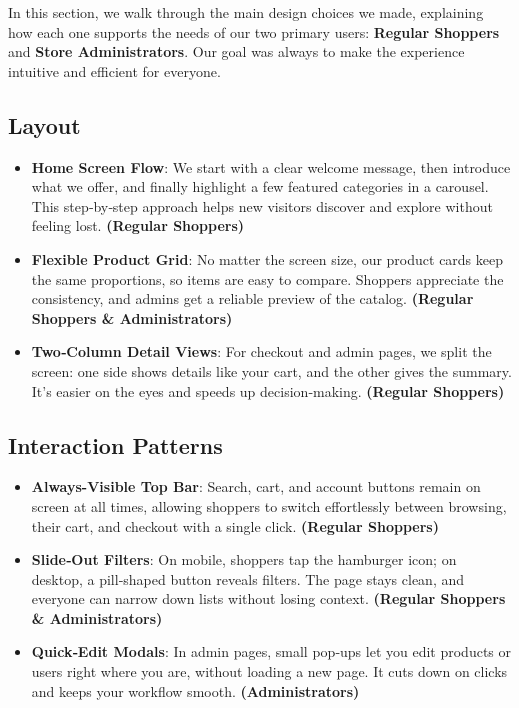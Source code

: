 \documentclass[12pt]{article}
\begin{document}
	In this section, we walk through the main design choices we made, explaining how each one supports the needs of our two primary users: \textbf{Regular Shoppers} and \textbf{Store Administrators}. Our goal was always to make the experience intuitive and efficient for everyone.

	\subsection{Layout}\label{subsec:layout}

	\begin{itemize}
	\item \textbf{Home Screen Flow}: We start with a clear welcome message, then introduce what we offer, and finally highlight a few featured categories in a carousel. This step‑by‑step approach helps new visitors discover and explore without feeling lost. \textbf{(Regular Shoppers)}
	\item \textbf{Flexible Product Grid}: No matter the screen size, our product cards keep the same proportions, so items are easy to compare. Shoppers appreciate the consistency, and admins get a reliable preview of the catalog. \textbf{(Regular Shoppers \& Administrators)}
	\item \textbf{Two‑Column Detail Views}: For checkout and admin pages, we split the screen: one side shows details like your cart, and the other gives the summary. It’s easier on the eyes and speeds up decision‑making. \textbf{(Regular Shoppers)}
	\end{itemize}

	\subsection{Interaction Patterns}\label{subsec:interaction-patterns}

	\begin{itemize}
	\item \textbf{Always-Visible Top Bar}: Search, cart, and account buttons remain on screen at all times, allowing shoppers to switch effortlessly between browsing, their cart, and checkout with a single click. \textbf{(Regular Shoppers)}
	\item \textbf{Slide‑Out Filters}: On mobile, shoppers tap the hamburger icon; on desktop, a pill‑shaped button reveals filters. The page stays clean, and everyone can narrow down lists without losing context. \textbf{(Regular Shoppers \& Administrators)}
	\item \textbf{Quick‑Edit Modals}: In admin pages, small pop‑ups let you edit products or users right where you are, without loading a new page. It cuts down on clicks and keeps your workflow smooth. \textbf{(Administrators)}
	\end{itemize}
\end{document}
